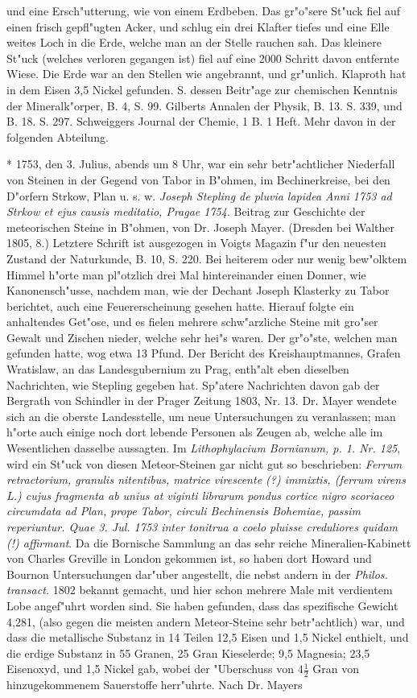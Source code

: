 \documentclass[a4paper, 11pt, oneside, polutonikogreek, german]{article}
\begin{document}
und eine Ersch"utterung, wie von einem Erdbeben. Das gr"o"sere St"uck fiel auf einen frisch gepfl"ugten Acker, und schlug ein drei Klafter tiefes und eine Elle weites Loch in die Erde, welche man an der Stelle rauchen sah. Das kleinere St"uck (welches verloren gegangen ist) fiel auf eine 2000 Schritt davon entfernte Wiese. Die Erde war an den Stellen wie angebrannt, und gr"unlich. Klaproth hat in dem Eisen 3,5 Nickel gefunden. S. dessen Beitr"age zur chemischen Kenntnis der Mineralk"orper, B. 4, S. 99. Gilberts Annalen der Physik, B. 13. S. 339, und B. 18. S. 297. Schweiggers Journal der Chemie, 1 B. 1 Heft. Mehr davon in der folgenden Abteilung.

* 1753, den 3. Julius, abends um 8 Uhr, war ein sehr betr"achtlicher Niederfall von Steinen in der Gegend von Tabor in B"ohmen, im Bechinerkreise, bei den D"orfern Strkow, Plan u. s. w. \emph{Joseph Stepling de pluvia lapidea Anni 1753 ad Strkow et ejus causis meditatio, Pragae 1754}. Beitrag zur Geschichte der meteorischen Steine in B"ohmen, von Dr. Joseph Mayer. (Dresden bei Walther 1805, 8.) Letztere Schrift ist ausgezogen in Voigts Magazin f"ur den neuesten Zustand der Naturkunde, B. 10, S. 220. Bei heiterem oder nur wenig bew"olktem Himmel h"orte man pl"otzlich drei Mal hintereinander einen Donner, wie Kanonensch"usse, nachdem man, wie der Dechant Joseph Klasterky zu Tabor berichtet, auch eine Feuererscheinung gesehen hatte. Hierauf folgte ein anhaltendes Get"ose, und es fielen mehrere schw"arzliche Steine mit gro"ser Gewalt und Zischen nieder, welche sehr hei"s waren. Der gr"o"ste, welchen man gefunden hatte, wog etwa 13 Pfund. Der Bericht des Kreishauptmannes, Grafen Wratislaw, an das Landesgubernium zu Prag, enth"alt eben dieselben Nachrichten, wie Stepling gegeben hat. Sp"atere Nachrichten davon gab der Bergrath von Schindler in der Prager Zeitung 1803, Nr. 13. Dr. Mayer wendete sich an die oberste Landesstelle, um neue Untersuchungen zu veranlassen; man h"orte auch einige noch dort lebende Personen als Zeugen ab, welche alle im Wesentlichen dasselbe aussagten. Im \emph{Lithophylacium Bornianum, p. 1. Nr. 125}, wird ein St"uck von diesen Meteor-Steinen gar nicht gut so beschrieben: \emph{Ferrum retractorium, granulis nitentibus, matrice virescente (?) immixtis, (ferrum virens L.) cujus fragmenta ab unius at viginti librarum pondus cortice nigro scoriaceo circumdata ad Plan, prope Tabor, circuli Bechinensis Bohemiae, passim reperiuntur. Quae 3. Jul. 1753 inter tonitrua a coelo pluisse creduliores quidam (!) affirmant}. Da die Bornische Sammlung an das sehr reiche Mineralien-Kabinett von Charles Greville in London gekommen ist, so haben dort Howard und Bournon Untersuchungen dar"uber angestellt, die nebst andern in der \emph{Philos. transact.} 1802 bekannt gemacht, und hier schon mehrere Male mit verdientem Lobe angef"uhrt worden sind. Sie haben gefunden, dass das spezifische Gewicht 4,281, (also gegen die meisten andern Meteor-Steine sehr betr"achtlich) war, und dass die metallische Substanz in 14 Teilen 12,5 Eisen und 1,5 Nickel enthielt, und die erdige Substanz in 55 Granen, 25 Gran Kieselerde; 9,5 Magnesia; 23,5 Eisenoxyd, und 1,5 Nickel gab, wobei der "Uberschuss von $\mathfrak{4\frac{1}{2}}$ Gran von hinzugekommenem Sauerstoffe herr"uhrte. Nach Dr. Mayers 
\end{document}
